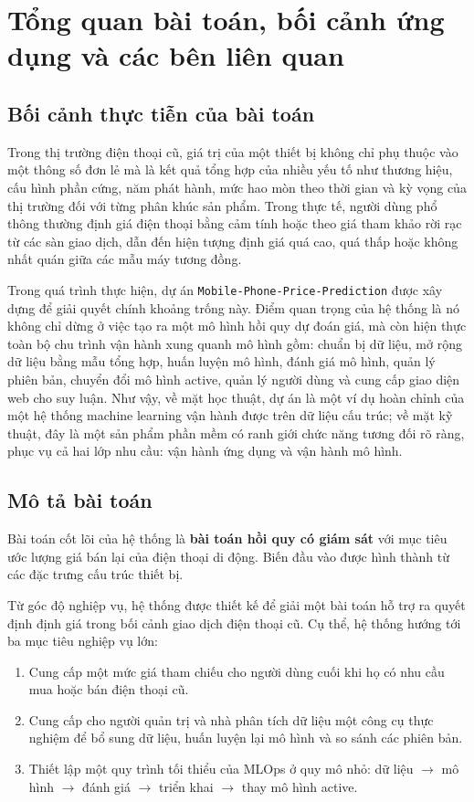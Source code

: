\section{Tổng quan bài toán, bối cảnh ứng dụng và các bên liên quan}

\subsection{Bối cảnh thực tiễn của bài toán}

Trong thị trường điện thoại cũ, giá trị của một thiết bị không chỉ phụ thuộc vào một thông số đơn lẻ mà là kết quả tổng hợp của nhiều yếu tố như thương hiệu, cấu hình phần cứng, năm phát hành, mức hao mòn theo thời gian và kỳ vọng của thị trường đối với từng phân khúc sản phẩm. Trong thực tế, người dùng phổ thông thường định giá điện thoại bằng cảm tính hoặc theo giá tham khảo rời rạc từ các sàn giao dịch, dẫn đến hiện tượng định giá quá cao, quá thấp hoặc không nhất quán giữa các mẫu máy tương đồng.

Trong quá trình thực hiện, dự án \texttt{Mobile-Phone-Price-Prediction} được xây dựng để giải quyết chính khoảng trống này. Điểm quan trọng của hệ thống là nó không chỉ dừng ở việc tạo ra một mô hình hồi quy dự đoán giá, mà còn hiện thực toàn bộ chu trình vận hành xung quanh mô hình gồm: chuẩn bị dữ liệu, mở rộng dữ liệu bằng mẫu tổng hợp, huấn luyện mô hình, đánh giá mô hình, quản lý phiên bản, chuyển đổi mô hình active, quản lý người dùng và cung cấp giao diện web cho suy luận. Như vậy, về mặt học thuật, dự án là một ví dụ hoàn chỉnh của một hệ thống machine learning vận hành được trên dữ liệu cấu trúc; về mặt kỹ thuật, đây là một sản phẩm phần mềm có ranh giới chức năng tương đối rõ ràng, phục vụ cả hai lớp nhu cầu: vận hành ứng dụng và vận hành mô hình.

\subsection{Mô tả bài toán}

Bài toán cốt lõi của hệ thống là \textbf{bài toán hồi quy có giám sát} với mục tiêu ước lượng giá bán lại của điện thoại di động. Biến đầu vào được hình thành từ các đặc trưng cấu trúc thiết bị. 

Từ góc độ nghiệp vụ, hệ thống được thiết kế để giải một bài toán hỗ trợ ra quyết định định giá trong bối cảnh giao dịch điện thoại cũ. Cụ thể, hệ thống hướng tới ba mục tiêu nghiệp vụ lớn:

\begin{enumerate}[label=\arabic*.]
    \item Cung cấp một mức giá tham chiếu cho người dùng cuối khi họ có nhu cầu mua hoặc bán điện thoại cũ.
    \item Cung cấp cho người quản trị và nhà phân tích dữ liệu một công cụ thực nghiệm để bổ sung dữ liệu, huấn luyện lại mô hình và so sánh các phiên bản.
    \item Thiết lập một quy trình tối thiểu của MLOps ở quy mô nhỏ: dữ liệu $\rightarrow$ mô hình $\rightarrow$ đánh giá $\rightarrow$ triển khai $\rightarrow$ thay mô hình active.
\end{enumerate}

